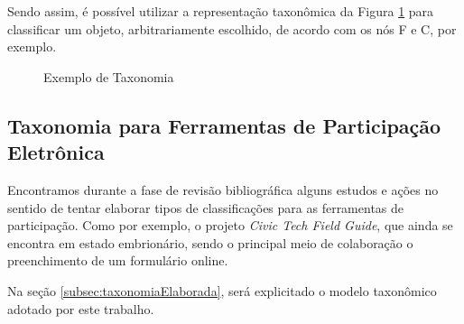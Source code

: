 \par
Sendo assim, é possível utilizar a representação taxonômica da Figura \ref{fig:exemploTaxonomia} para classificar um objeto, arbitrariamente escolhido,
de acordo com os nós F e C, por exemplo.

\begin{figure}[!ht]
\caption{Exemplo de Taxonomia}
\label{fig:exemploTaxonomia}  
\end{figure}

\subsection{Taxonomia para Ferramentas de Participação Eletrônica}
\label{subsec:taxonomia e-part tools}
\par
Encontramos durante a fase de revisão bibliográfica alguns estudos e ações no sentido de tentar elaborar tipos de classificações para as ferramentas de participação.
Como por exemplo, o projeto \textit{Civic Tech Field Guide}, que ainda se encontra em estado embrionário, sendo o principal meio de colaboração o preenchimento de um formulário online.

\par
Na seção \ref{subsec:taxonomiaElaborada}, será explicitado o modelo taxonômico adotado por este trabalho.


